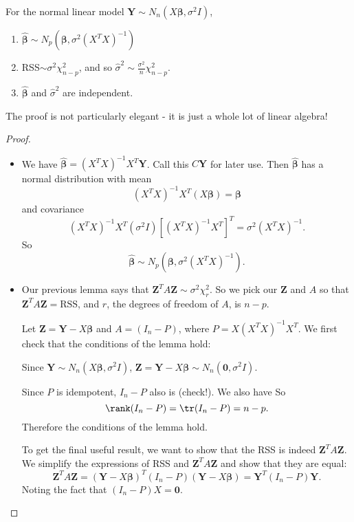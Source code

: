 \documentclass[a4paper]{article}
\begin{document}
\begin{thm}[]
  For the normal linear model $\mathbf{Y}\sim N_n(X\boldsymbol\beta, \sigma^2 I)$,
  \begin{enumerate}
    \item $\hat{\boldsymbol\beta} \sim N_p(\boldsymbol\beta, \sigma^2(X^TX)^{-1})$
    \item RSS$\sim \sigma^2 \chi_{n - p}^2$, and so $\hat{\sigma}^2 \sim \frac{\sigma^2}{n}\chi_{n -p}^2$.
    \item $\hat{\boldsymbol\beta}$ and $\hat{\sigma}^2$ are independent.
  \end{enumerate}
\end{thm}

The proof is not particularly elegant - it is just a whole lot of linear algebra!

\begin{proof}\leavevmode
  \begin{itemize}
    \item We have $\hat{\boldsymbol\beta} = (X^TX)^{-1}X^T\mathbf{Y}$. Call this $C\mathbf{Y}$ for later use. Then $\hat {\boldsymbol\beta}$ has a normal distribution with mean
      \[
        (X^TX)^{-1}X^T(X\boldsymbol\beta) = \boldsymbol\beta
      \]
      and covariance
      \[
        (X^TX)^{-1}X^T(\sigma^2 I)[(X^TX)^{-1}X^T]^T = \sigma^2(X^TX)^{-1}.
      \]
      So
      \[
        \hat{\boldsymbol\beta}\sim N_p(\boldsymbol\beta, \sigma^2(X^TX)^{-1}).
      \]
    \item
      Our previous lemma says that $\mathbf{Z}^TA\mathbf{Z}\sim \sigma^2 \chi_r^2$. So we pick our $\mathbf{Z}$ and $A$ so that $\mathbf{Z}^TA\mathbf{Z} = \mathrm{RSS}$, and $r$, the degrees of freedom of $A$, is $n - p$.

      Let $\mathbf{Z} = \mathbf{Y} - X\boldsymbol\beta$ and $A = (I_n - P)$, where $P = X(X^TX)^{-1}X^T$. We first check that the conditions of the lemma hold:

      Since $\mathbf{Y}\sim N_n(X\boldsymbol\beta, \sigma^2 I)$, $\mathbf{Z} = \mathbf{Y} - X\boldsymbol\beta\sim N_n(\mathbf{0}, \sigma^2 I)$.

      Since $P$ is idempotent, $I_n - P$ also is (check!). We also have
      So
      \[
        \rank(I_n - P) = \tr(I_n - P) = n - p.
      \]
      Therefore the conditions of the lemma hold.

      To get the final useful result, we want to show that the RSS is indeed $\mathbf{Z}^TA\mathbf{Z}$. We simplify the expressions of RSS and $\mathbf{Z}^TA\mathbf{Z}$ and show that they are equal:
      \[
        \mathbf{Z}^TA\mathbf{Z} = (\mathbf{Y} - X\boldsymbol\beta)^T(I_n - P)(\mathbf{Y} - X\boldsymbol\beta)=\mathbf{Y}^T(I_n - P)\mathbf{Y}.
      \]
      Noting the fact that $(I_n - P)X = \mathbf{0}$.


\end{itemize}
\end{proof}
\end{document}
